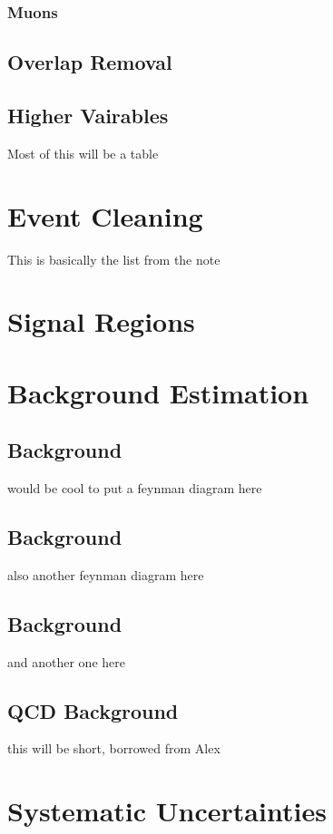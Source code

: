 \subsubsection{Muons}
\subsection{Overlap Removal}
\subsection{Higher Vairables}
Most of this will be a table
\subsubsection{\met}

\section{Event Cleaning}
This is basically the list from the note

\section{Signal Regions}

\section{Background Estimation}
\subsection{\wjets Background}
would be cool to put a feynman diagram here
\subsection{\zjets Background}
also another feynman diagram here
\subsection{\topbg Background}
and another one here
\subsection{QCD Background}
this will be short, borrowed from Alex

\section{Systematic Uncertainties}
